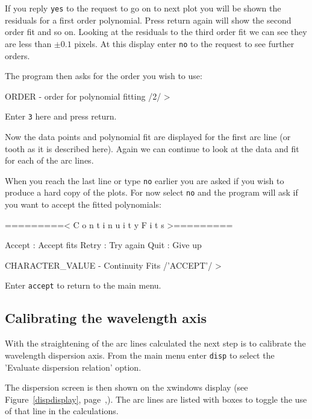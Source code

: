 \documentclass[twoside,11pt]{starlink}
\providecommand{\scspec}[2]{#1}
\begin{document}
If you reply \texttt{yes} to the request to go on to next plot you will
be shown the residuals for a first order polynomial. Press return
again will show the second order fit and so on. Looking at the
residuals to the third order fit we can see they are less than
$\pm0.1$ pixels. At this display enter \texttt{no} to the request to see
further orders.

The program then asks for the order you wish to use:
{\scspec{\small}{ }
\begin{terminalv}
ORDER - order for polynomial fitting /2/ >
\end{terminalv}
}

Enter \texttt{3} here and press return.

Now the data points and polynomial fit are displayed for the first arc
line (or tooth as it is described here). Again we can continue to look
at the data and fit for each of the arc lines.

When you reach the last line or type \texttt{no} earlier you are asked if
you wish to produce a hard copy of the plots. For now select \texttt{no}
and the program will ask if you want to accept the fitted polynomials:

{\scspec{\small}{ }
\begin{terminalv}
=========< C o n t i n u i t y   F i t s >=========

Accept : Accept fits
Retry  : Try again
Quit   : Give up

CHARACTER_VALUE - Continuity Fits /'ACCEPT'/ >
\end{terminalv}
}

Enter \texttt{accept} to return to the main menu.

\subsection{Calibrating the wavelength axis}


With the straightening of the arc lines calculated the next step is to
calibrate the wavelength dispersion axis. From the main menu enter
\texttt{disp} to select the 'Evaluate dispersion relation' option.

The dispersion screen is then shown on the xwindows display (see
\scspec{Figure~\ref{dispdisplay}, page~\pageref{dispdisplay},}{the
figure below}). The arc lines are listed with boxes to toggle the use
of that line in the calculations.
\end{document}
